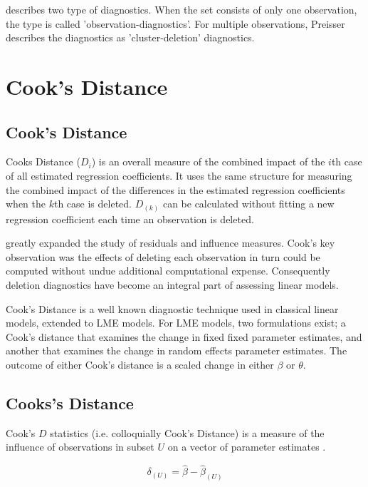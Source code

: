 \documentclass[12pt, a4paper]{report}
\theoremstyle{plain}
\theoremstyle{definition}
\theoremstyle{remark}
\begin{document}
\citet{preisser} describes two type of diagnostics. When the set consists of only one observation, the type is called
'observation-diagnostics'. For multiple observations, Preisser describes the diagnostics as 'cluster-deletion' diagnostics.



\newpage
\section{Cook's Distance} %

\subsection{Cook's Distance}%
Cooks Distance ($D_{i}$) is an overall measure of the combined impact of the $i$th case of all estimated regression coefficients. It uses the same structure for measuring the combined impact of the differences in the estimated regression coefficients when the $k$th case is deleted. $D_{(k)}$ can be calculated without fitting
a new regression coefficient each time an observation is deleted.


\citet{cook77} greatly expanded the study of residuals and influence measures. Cook's key observation was the effects of deleting each observation in turn could be computed without undue additional computational expense. Consequently deletion diagnostics have become an integral part of assessing linear models.

Cook's Distance is a well known diagnostic technique used in classical linear models, extended to LME models.  For LME models, two formulations exist; a Cook's distance that examines the change in fixed fixed parameter estimates, and another that examines the change in random effects parameter estimates. The outcome of either Cook's distance is a scaled change in either $\beta$ or $\theta$.

\subsection{Cooks's Distance}%
 Cook's $D$ statistics (i.e. colloquially Cook's Distance) is a measure of the influence of observations in subset $U$ on a vector of parameter estimates \citep{cook77}.

\[ \delta_{(U)} = \hat{\beta} - \hat{\beta}_{(U)}\]
\end{document}
